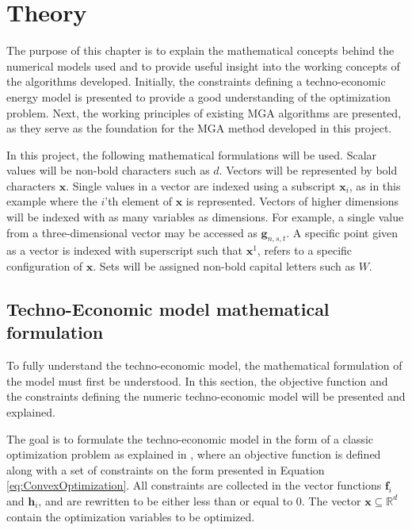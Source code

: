 
\chapter{Theory}
The purpose of this chapter is to explain the mathematical concepts behind the numerical models used and to provide useful insight into the working concepts of the algorithms developed. Initially, the constraints defining a techno-economic energy model is presented to provide a good understanding of the optimization problem. Next, the working principles of existing MGA algorithms are presented, as they serve as the foundation for the MGA method developed in this project. 

In this project, the following mathematical formulations will be used. Scalar values will be non-bold characters such as $d$. Vectors will be represented by bold characters $ \mathbf{x} $. Single values in a vector are indexed using a subscript $ \mathbf{x}_i $, as in this example where the $i$'th element of $\mathbf{x}$ is represented. Vectors of higher dimensions will be indexed with as many variables as dimensions. For example, a single value from a three-dimensional vector may be accessed as $\mathbf{g}_{n,s,t}$. A specific point given as a vector is indexed with superscript such that  $\mathbf{x}^1$, refers to a specific configuration of $\mathbf{x}$. Sets will be assigned non-bold capital letters such as $W$. 

\section{Techno-Economic model mathematical formulation}\label{sec:OptimizationProblem}

To fully understand the techno-economic model, the mathematical formulation of the model must first be understood. In this section, the objective function and the constraints defining the numeric techno-economic model will be presented and explained. 

The goal is to formulate the techno-economic model in the form of a classic optimization problem as explained in \cite{ConvexOpimization}, where an objective function is defined along with a set of constraints on the form presented in Equation \ref{eq:ConvexOptimization}. All constraints are collected in the vector functions  $\mathbf{f}_i$ and $\mathbf{h}_i$, and are rewritten to be either less than or equal to $0$. The vector $\mathbf{x} \subseteq \mathbb{R}^d$ contain the optimization variables to be optimized. 

